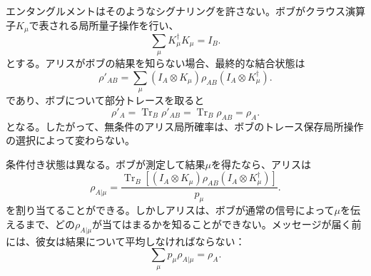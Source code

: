 エンタングルメントはそのようなシグナリングを許さない。ボブがクラウス演算子\(K_\mu\)で表される局所量子操作を行い、
\begin{equation}
\sum_\mu K_\mu^\dagger K_\mu=I_B.
\end{equation}
とする。アリスがボブの結果を知らない場合、最終的な結合状態は
\begin{equation}
\rho'_{AB}
=\sum_\mu
(I_A\otimes K_\mu)\rho_{AB}
(I_A\otimes K_\mu^\dagger).
\end{equation}
であり、ボブについて部分トレースを取ると
\begin{equation}
\rho'_A
=\operatorname{Tr}_B\rho'_{AB}
=\operatorname{Tr}_B\rho_{AB}
=\rho_A.
\label{eq:l7-no-signaling}
\end{equation}
となる。したがって、無条件のアリス局所確率は、ボブのトレース保存局所操作の選択によって変わらない。

条件付き状態は異なる。ボブが測定して結果\(\mu\)を得たなら、アリスは
\begin{equation}
\rho_{A|\mu}
=\frac{
\operatorname{Tr}_B\!\left[
(I_A\otimes K_\mu)\rho_{AB}
(I_A\otimes K_\mu^\dagger)
\right]
}{p_\mu}.
\label{eq:l7-conditioned-state}
\end{equation}
を割り当てることができる。しかしアリスは、ボブが通常の信号によって\(\mu\)を伝えるまで、どの\(\rho_{A|\mu}\)が当てはまるかを知ることができない。メッセージが届く前には、彼女は結果について平均しなければならない：
\begin{equation}
\sum_\mu p_\mu\rho_{A|\mu}=\rho_A.
\label{eq:l7-conditioned-average}
\end{equation}

\begin{classroomqa}
\end{classroomqa}

\begin{classroomqa}
\end{classroomqa}

